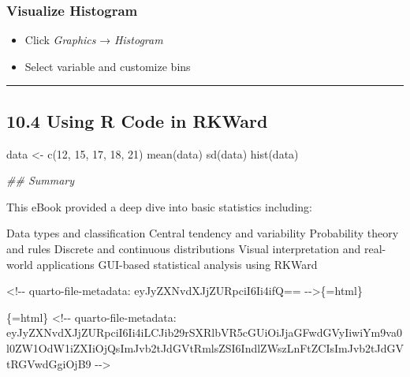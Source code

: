 \documentclass[
  letterpaper,
  DIV=11,
  numbers=noendperiod]{scrreprt}
\newenvironment{Shaded}{\begin{snugshade}}{\end{snugshade}}
\newcommand{\AttributeTok}[1]{\textcolor[rgb]{0.40,0.45,0.13}{#1}}
\newcommand{\DecValTok}[1]{\textcolor[rgb]{0.68,0.00,0.00}{#1}}
\newcommand{\DocumentationTok}[1]{\textcolor[rgb]{0.37,0.37,0.37}{\textit{#1}}}
\newcommand{\FunctionTok}[1]{\textcolor[rgb]{0.28,0.35,0.67}{#1}}
\newcommand{\NormalTok}[1]{\textcolor[rgb]{0.00,0.23,0.31}{#1}}
\newcommand{\OtherTok}[1]{\textcolor[rgb]{0.00,0.23,0.31}{#1}}
\newcommand{\SpecialCharTok}[1]{\textcolor[rgb]{0.37,0.37,0.37}{#1}}
\newcommand{\StringTok}[1]{\textcolor[rgb]{0.13,0.47,0.30}{#1}}
\providecommand{\tightlist}{%
  \setlength{\itemsep}{0pt}\setlength{\parskip}{0pt}}
\begin{document}
\subsubsection{Visualize Histogram}\label{visualize-histogram}

\begin{itemize}
\tightlist
\item
  Click \emph{Graphics} → \emph{Histogram}
\item
  Select variable and customize bins
\end{itemize}

\begin{center}\rule{0.5\linewidth}{0.5pt}\end{center}

\subsection{10.4 Using R Code in RKWard}\label{using-r-code-in-rkward}

\begin{Shaded}
\begin{Highlighting}[]
\NormalTok{data }\OtherTok{\textless{}{-}} \FunctionTok{c}\NormalTok{(}\DecValTok{12}\NormalTok{, }\DecValTok{15}\NormalTok{, }\DecValTok{17}\NormalTok{, }\DecValTok{18}\NormalTok{, }\DecValTok{21}\NormalTok{)}
\FunctionTok{mean}\NormalTok{(data)}
\FunctionTok{sd}\NormalTok{(data)}
\FunctionTok{hist}\NormalTok{(data)}

\DocumentationTok{\#\# Summary}

\NormalTok{This eBook provided a deep dive into basic statistics including}\SpecialCharTok{:}

\NormalTok{Data types and classification}
\NormalTok{Central tendency and variability}
\NormalTok{Probability theory and rules}
\NormalTok{Discrete and continuous distributions}
\NormalTok{Visual interpretation and real}\SpecialCharTok{{-}}\NormalTok{world applications}
\NormalTok{GUI}\SpecialCharTok{{-}}\NormalTok{based statistical analysis using RKWard}





\StringTok{\textasciigrave{}}\AttributeTok{\textless{}!{-}{-} quarto{-}file{-}metadata: eyJyZXNvdXJjZURpciI6Ii4ifQ== {-}{-}\textgreater{}}\StringTok{\textasciigrave{}}\NormalTok{\{}\OtherTok{=}\NormalTok{html\}}

\StringTok{\textasciigrave{}\textasciigrave{}\textasciigrave{}}\AttributeTok{\{=html\}}
\AttributeTok{\textless{}!{-}{-} quarto{-}file{-}metadata: eyJyZXNvdXJjZURpciI6Ii4iLCJib29rSXRlbVR5cGUiOiJjaGFwdGVyIiwiYm9va0l0ZW1OdW1iZXIiOjQsImJvb2tJdGVtRmlsZSI6IndlZWszLnFtZCIsImJvb2tJdGVtRGVwdGgiOjB9 {-}{-}\textgreater{}}
\end{Highlighting}
\end{Shaded}
\end{document}

